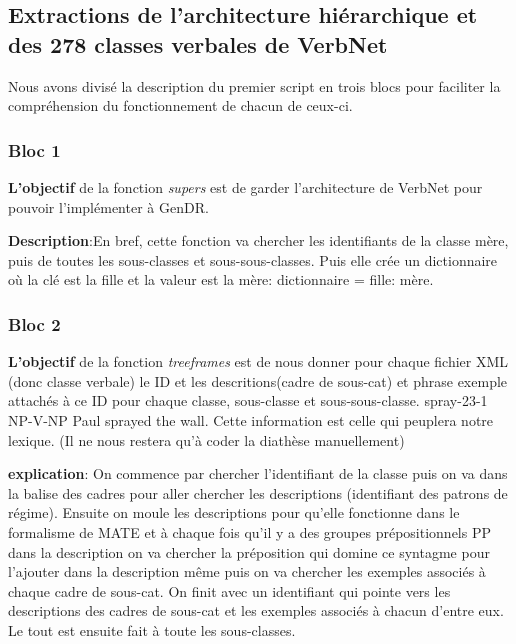 \subsection{Extractions de l'architecture hiérarchique et des 278 classes verbales de VerbNet}

Nous avons divisé la description du premier script en trois blocs pour faciliter la compréhension du fonctionnement de chacun de ceux-ci.


\subsubsection{Bloc 1}
\textbf{L'objectif} de la fonction \emph{supers} est de garder l'architecture de VerbNet pour pouvoir l'implémenter à GenDR.

\textbf{Description}:En bref, cette fonction va chercher les identifiants de la classe mère, puis de toutes les sous-classes et sous-sous-classes. Puis elle crée un dictionnaire où la clé est la fille et la valeur est la mère: dictionnaire = {fille: mère}. 

\subsubsection{Bloc 2}
\textbf{L'objectif} de la fonction \emph{treeframes} est de nous donner pour chaque fichier XML (donc classe verbale) le ID et les descritions(cadre de sous-cat) et phrase exemple attachés à ce ID pour chaque classe, sous-classe et sous-sous-classe. spray-23-1 NP-V-NP Paul sprayed the wall. Cette information est celle qui peuplera notre lexique. (Il ne nous restera qu'à coder la diathèse manuellement)

\textbf{explication}: On commence par chercher l'identifiant de la classe puis on va dans la balise des cadres pour aller chercher les descriptions (identifiant des patrons de régime). Ensuite on moule les descriptions pour qu'elle fonctionne dans le formalisme de MATE et à chaque fois qu'il y a des groupes prépositionnels PP dans la description on va chercher la préposition qui domine ce syntagme pour l'ajouter dans la description même  puis on va chercher les exemples associés à chaque cadre de sous-cat. On finit avec un identifiant qui pointe vers les descriptions des cadres de sous-cat et les exemples associés à chacun d'entre eux. Le tout est ensuite fait à toute les sous-classes.

